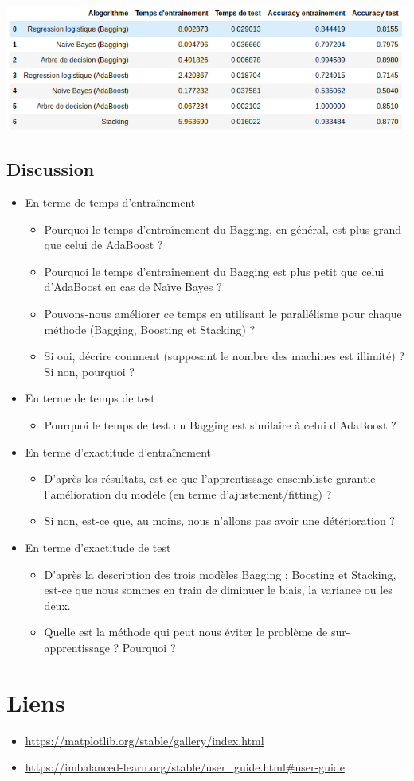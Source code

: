 \documentclass[12pt, a4paper]{article}
\begin{document}
\includegraphics[width=\textwidth]{../img/workshop/criteres2.png}

\subsection{Discussion}

\begin{itemize}
	\item En terme de temps d'entraînement
	\begin{itemize}
		\item Pourquoi le temps d'entraînement du Bagging, en général, est plus grand que celui de AdaBoost ?
		\item Pourquoi le temps d'entraînement du Bagging est plus petit que celui d'AdaBoost en cas de Naïve Bayes ?
		\item Pouvons-nous améliorer ce temps en utilisant le parallélisme pour chaque méthode (Bagging, Boosting et Stacking) ?
		\item Si oui, décrire comment (supposant le nombre des machines est illimité) ? Si non, pourquoi ?
	\end{itemize}
	\item En terme de temps de test
	\begin{itemize}
		\item Pourquoi le temps de test du Bagging est similaire à celui d'AdaBoost ?
	\end{itemize}
	\item En terme d'exactitude d'entraînement
	\begin{itemize}
		\item D'après les résultats, est-ce que l'apprentissage ensembliste garantie l'amélioration du modèle (en terme d'ajustement/fitting) ?
		\item Si non, est-ce que, au moins, nous n'allons pas avoir une détérioration ?
	\end{itemize}
	\item En terme d'exactitude de test
	\begin{itemize}
		\item D'après la description des trois modèles Bagging ; Boosting et Stacking, est-ce que nous sommes en train de diminuer le biais, la variance ou les deux.
		\item Quelle est la méthode qui peut nous éviter le problème de sur-apprentissage ? Pourquoi ?
	\end{itemize}
\end{itemize}


\section*{Liens}

\begin{itemize}
	\item \url{https://matplotlib.org/stable/gallery/index.html}
	\item \url{https://imbalanced-learn.org/stable/user_guide.html#user-guide}
\end{itemize}
\end{document}

